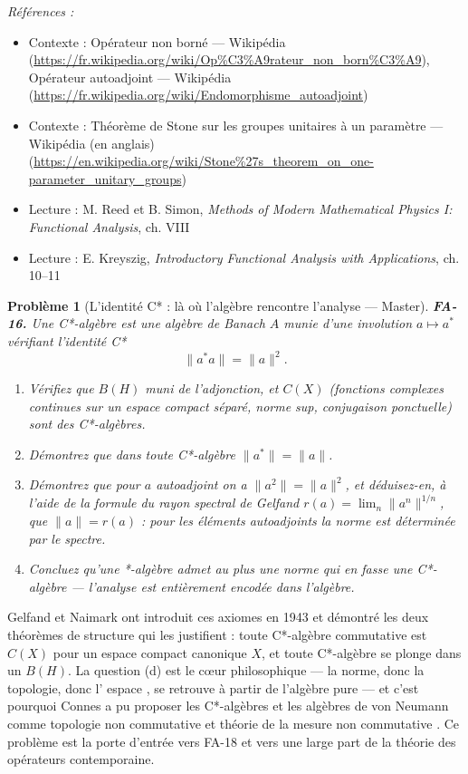 \documentclass[11pt]{article}
\newtheorem{problem}{Problème}
\newenvironment{refs}{\par\small\noindent\emph{Références :}\begin{itemize}\setlength\itemsep{0pt}}{\end{itemize}\normalsize}
\begin{document}
\begin{refs}
\item Contexte : Opérateur non borné --- Wikipédia (\url{https://fr.wikipedia.org/wiki/Op%C3%A9rateur_non_born%C3%A9}), Opérateur autoadjoint --- Wikipédia (\url{https://fr.wikipedia.org/wiki/Endomorphisme_autoadjoint})
\item Contexte : Théorème de Stone sur les groupes unitaires à un paramètre --- Wikipédia (en anglais) (\url{https://en.wikipedia.org/wiki/Stone%27s_theorem_on_one-parameter_unitary_groups})
\item Lecture : M. Reed et B. Simon, \textit{Methods of Modern Mathematical Physics I: Functional Analysis}, ch. VIII
\item Lecture : E. Kreyszig, \textit{Introductory Functional Analysis with Applications}, ch. 10--11
\end{refs}

\bigskip

\begin{problem}[{L'identité C* : là où l'algèbre rencontre l'analyse --- Master}]
\textbf{FA-16.} Une \textit{C*-algèbre} est une algèbre de Banach $ A $ munie d'une involution
$ a \mapsto a^{*} $ vérifiant l'identité C*
\[ \|a^{*}a\| = \|a\|^2 . \]
\begin{enumerate}
\item[(a)] Vérifiez que $ B(H) $ muni de l'adjonction, et $ C(X) $ (fonctions complexes continues sur un
espace compact séparé, norme sup, conjugaison ponctuelle) sont des C*-algèbres.
\item[(b)] Démontrez que dans toute C*-algèbre $ \|a^{*}\| = \|a\| $.
\item[(c)] Démontrez que pour $ a $ autoadjoint on a $ \|a^2\| = \|a\|^2 $, et déduisez-en, à l'aide de
la formule du rayon spectral de Gelfand $ r(a) = \lim_n \|a^n\|^{1/n} $, que $ \|a\| = r(a) $ :
pour les éléments autoadjoints la norme est déterminée par le spectre.
\item[(d)] Concluez qu'une *-algèbre admet au plus une norme qui en fasse une C*-algèbre --- l'analyse est
entièrement encodée dans l'algèbre.
\end{enumerate}

\end{problem}

\noindent Gelfand et Naimark ont introduit ces axiomes en 1943 et démontré les deux théorèmes de
structure qui les justifient : toute C*-algèbre commutative est $ C(X) $ pour un espace compact
canonique $ X $, et toute C*-algèbre se plonge dans un $ B(H) $. La question (d) est le c\oe{}ur
philosophique --- la norme, donc la topologie, donc l'\og{} espace \fg{}, se retrouve à partir de l'algèbre pure ---
et c'est pourquoi Connes a pu proposer les C*-algèbres et les algèbres de von Neumann comme \og{} topologie
non commutative \fg{} et \og{} théorie de la mesure non commutative \fg{}. Ce problème est la porte d'entrée vers
FA-18 et vers une large part de la théorie des opérateurs contemporaine.
\end{document}
